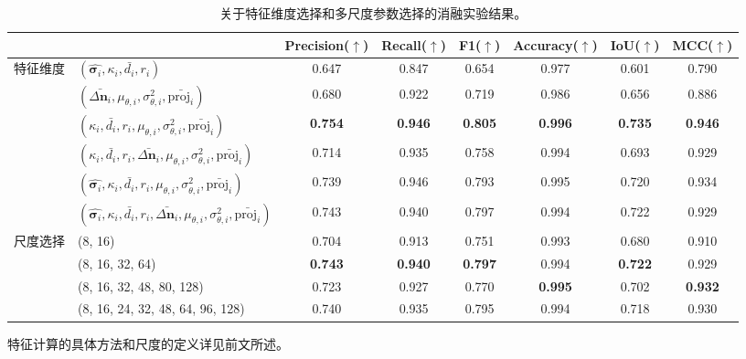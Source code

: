 \begin{table}[ht]
    \centering
    \small
    \setlength{\tabcolsep}{1pt}
    \caption{关于特征维度选择和多尺度参数选择的消融实验结果。}
    \label{tab:ablation_study}
    \begin{threeparttable}
    \begin{tabular}{llcccccc}
            \toprule
            &  & Precision($\uparrow$) & Recall($\uparrow$)  & F1($\uparrow$) & Accuracy($\uparrow$) & IoU($\uparrow$) & MCC($\uparrow$) \\
            \midrule
   
            \multirow{6}{*}{特征维度}
            & $(\hat{\mathbf{\sigma}_i}, \kappa_i, \bar{d_i}, r_i)$ & 0.647 & 0.847 & 0.654 & 0.977 & 0.601 & 0.790 \\
            & $(\bar{\Delta \mathbf{n}_i}, \mu_{\theta,i}, \sigma^2_{\theta,i}, \bar{\text{proj}_i})$ & 0.680 & 0.922 & 0.719 & 0.986 & 0.656 & 0.886 \\
            & $(\kappa_i, \bar{d_i}, r_i, \mu_{\theta,i}, \sigma^2_{\theta,i}, \bar{\text{proj}_i})$ & \textbf{0.754} & \textbf{0.946} & \textbf{0.805} & \textbf{0.996} & \textbf{0.735} & \textbf{0.946} \\
            & $(\kappa_i, \bar{d_i}, r_i, \bar{\Delta \mathbf{n}_i}, \mu_{\theta,i}, \sigma^2_{\theta,i}, \bar{\text{proj}_i})$ & 0.714 & 0.935 & 0.758 & 0.994 & 0.693 & 0.929 \\
            & $(\hat{\mathbf{\sigma}_i}, \kappa_i, \bar{d_i}, r_i, \mu_{\theta,i}, \sigma^2_{\theta,i}, \bar{\text{proj}_i})$ & 0.739 & 0.946 & 0.793 & 0.995 & 0.720 & 0.934 \\
            & $(\hat{\mathbf{\sigma}_i}, \kappa_i, \bar{d_i}, r_i, \bar{\Delta \mathbf{n}_i}, \mu_{\theta,i}, \sigma^2_{\theta,i}, \bar{\text{proj}_i})$ & 0.743 & 0.940 & 0.797 & 0.994 & 0.722 & 0.929 \\
           
            \midrule
           
            \multirow{4}{*}{尺度选择}
            & (8, 16) & 0.704 & 0.913 & 0.751 & 0.993 & 0.680 & 0.910 \\
            & (8, 16, 32, 64) & \textbf{0.743} & \textbf{0.940} & \textbf{0.797} & 0.994 & \textbf{0.722} & 0.929 \\
            & (8, 16, 32, 48, 80, 128) & 0.723 & 0.927 & 0.770 & \textbf{0.995} & 0.702 & \textbf{0.932} \\
            & (8, 16, 24, 32, 48, 64, 96, 128) & 0.740 & 0.935 & 0.795 & 0.994 & 0.718 & 0.930 \\
           
            \bottomrule
        \end{tabular}
        \begin{tablenotes}
            \footnotesize
             \item 特征计算的具体方法和尺度的定义详见前文所述。
        \end{tablenotes}
        \end{threeparttable}
       
\end{table}

